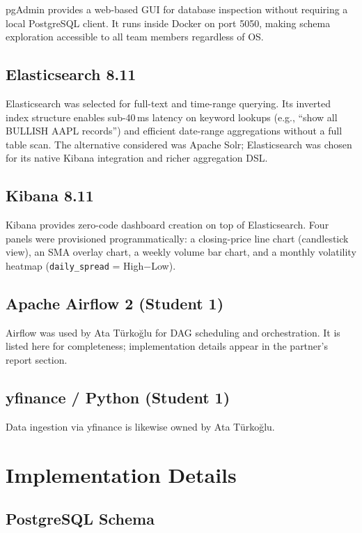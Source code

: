 \documentclass[conference]{IEEEtran}
\begin{document}
pgAdmin provides a web-based GUI for database inspection without requiring a local
PostgreSQL client. It runs inside Docker on port 5050, making schema exploration
accessible to all team members regardless of OS.

\subsection{Elasticsearch 8.11}

Elasticsearch was selected for full-text and time-range querying. Its inverted
index structure enables sub-40\,ms latency on keyword lookups (e.g., ``show all
BULLISH AAPL records'') and efficient date-range aggregations without a full
table scan. The alternative considered was Apache Solr; Elasticsearch was chosen
for its native Kibana integration and richer aggregation DSL.

\subsection{Kibana 8.11}

Kibana provides zero-code dashboard creation on top of Elasticsearch. Four panels
were provisioned programmatically: a closing-price line chart (candlestick view),
an SMA overlay chart, a weekly volume bar chart, and a monthly volatility heatmap
(\texttt{daily\_spread} = High$-$Low).

\subsection{Apache Airflow 2 (Student 1)}

Airflow was used by Ata Türkoğlu for DAG scheduling and orchestration.
It is listed here for completeness; implementation details appear in the
partner's report section.

\subsection{yfinance / Python (Student 1)}

Data ingestion via yfinance is likewise owned by Ata Türkoğlu.

\section{Implementation Details}

\subsection{PostgreSQL Schema}
\end{document}
